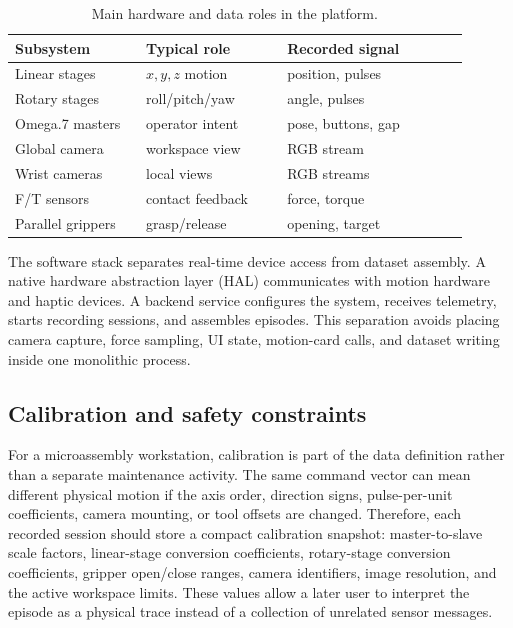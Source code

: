 \documentclass[10pt,twocolumn,letterpaper]{article}
\begin{document}
\begin{table}[t]
  \centering
  \footnotesize
  \caption{Main hardware and data roles in the platform.}
  \label{tab:hardware}
  \begin{tabular}{@{}L{0.26\linewidth}L{0.28\linewidth}L{0.36\linewidth}@{}}
    \toprule
    Subsystem & Typical role & Recorded signal \\
    \midrule
    Linear stages & $x,y,z$ motion & position, pulses \\
    Rotary stages & roll/pitch/yaw & angle, pulses \\
    Omega.7 masters & operator intent & pose, buttons, gap \\
    Global camera & workspace view & RGB stream \\
    Wrist cameras & local views & RGB streams \\
    F/T sensors & contact feedback & force, torque \\
    Parallel grippers & grasp/release & opening, target \\
    \bottomrule
  \end{tabular}
\end{table}

The software stack separates real-time device access from dataset
assembly. A native hardware abstraction layer (HAL) communicates with
motion hardware and haptic devices. A backend service configures the
system, receives telemetry, starts recording sessions, and assembles
episodes. This separation avoids placing camera capture, force sampling,
UI state, motion-card calls, and dataset writing inside one monolithic
process.

\subsection{Calibration and safety constraints}
For a microassembly workstation, calibration is part of the data
definition rather than a separate maintenance activity. The same command
vector can mean different physical motion if the axis order, direction
signs, pulse-per-unit coefficients, camera mounting, or tool offsets are
changed. Therefore, each recorded session should store a compact
calibration snapshot: master-to-slave scale factors, linear-stage
conversion coefficients, rotary-stage conversion coefficients, gripper
open/close ranges, camera identifiers, image resolution, and the active
workspace limits. These values allow a later user to interpret the
episode as a physical trace instead of a collection of unrelated sensor
messages.
\end{document}

